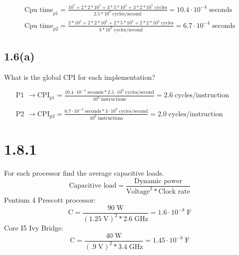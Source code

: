 \documentclass[12pt]{article}
\begin{document}
\begin{align*}
	\text{Cpu time}_{p1} = \frac{10^5+2*2*10^5+3*5*10^5+3*2*10^5\;\text{cycles}}{2.5*10^9\;\text{cycles/second}} = 10.4\cdot10^{-4}\;\text{seconds}\\
	\text{Cpu time}_{p2} = \frac{2*10^5+2*2*10^5+2*5*10^5+2*2*10^5\;\text{cycles}}{3*10^9\;\text{cycles/second}} = 6.7\cdot10^{-4}\;\text{seconds}
\end{align*}

\subsection*{1.6(a)}
What is the global CPI for each implementation?
\begin{itemize}
	\item[P1]$\rightarrow\text{CPI}_{p1} = \frac{10.4\cdot{10^{-4}\;\text{seconds}}*2.5\cdot10^9\;\text{cycles/second}}{10^6\;\text{instructions}} = 2.6\;\text{cycles/instruction}$
	\item[P2]$\rightarrow\text{CPI}_{p2} = \frac{6.7\cdot{10^{-4}\;\text{seconds}}*3\cdot10^9\;\text{cycles/second}}{10^6\;\text{instructions}} = 2.0\;\text{cycles/instruction}$
\end{itemize}

\section*{1.8.1}
For each processor find the average capacitive loads.
\begin{equation*}
	\text{Capacitive load} = \frac{\text{Dynamic power}}{\text{Voltage}^2*\text{Clock rate}}
\end{equation*}
Pentium 4 Prescott processor:
\[
	\text{C} = \frac{90\;\text{W}}{(1.25\;\text{V})^2*2.6\;\text{GHz}} = 1.6\cdot{10^{-8}}\;\text{F}
\]
Core I5 Ivy Bridge:
\[
	\text{C} = \frac{40\;\text{W}}{(.9\;\text{V})^2*3.4\;\text{GHz}} = 1.45\cdot{10^{-8}}\;\text{F}
\]
\end{document}
